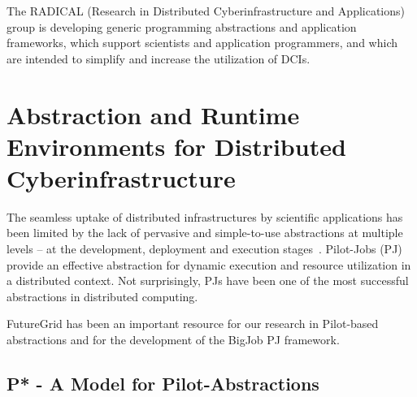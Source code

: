 \documentclass[]{paper}
\newcommand{\jhanote}[1]{ {\textcolor{red} { ***shantenu: #1 }}}
\newcommand{\jhanote}[1]{}
\begin{document}

The RADICAL (Research in Distributed Cyberinfrastructure and
Applications) group is developing generic programming abstractions and
application frameworks, which support scientists and application
programmers, and which are intended to simplify and increase the
utilization of DCIs. 



% 



\section{Abstraction and Runtime Environments for Distributed Cyberinfrastructure}

The seamless uptake of distributed infrastructures by scientific applications
has been limited by the lack of pervasive and simple-to-use abstractions at
multiple levels -- at the development, deployment and execution
stages~\cite{dpagrid2009}. Pilot-Jobs (PJ) provide an effective abstraction for
dynamic execution and resource utilization in a distributed context. Not
surprisingly, PJs have been one of the most successful abstractions in
distributed computing. 

FutureGrid has been an important resource for our research in
Pilot-based abstractions and for the development of the BigJob PJ
framework\cite{saga_bigjob_condor_cloud}.

\subsection{P* - A Model for Pilot-Abstractions}
\end{document}
